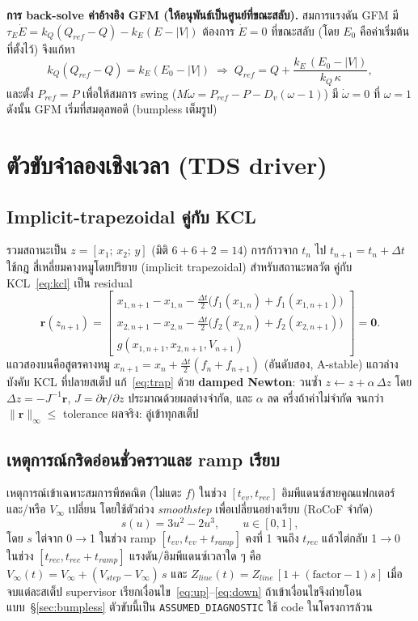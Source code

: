 \documentclass[12pt,a4paper]{article}
\begin{document}
\textbf{การ back-solve ค่าอ้างอิง GFM (ให้อนุพันธ์เป็นศูนย์ที่ขณะสลับ).} สมการแรงดัน GFM มี
$\tau_E\dot E = k_Q(Q_{ref}-Q) - k_E(E-\lvert V\rvert)$ ต้องการ $\dot E=0$ ที่ขณะสลับ (โดย $E_0$ คือค่าเริ่มต้น
ที่ตั้งไว้) จึงแก้หา
\begin{equation}
k_Q(Q_{ref}-Q) = k_E(E_0-\lvert V\rvert)
\;\Rightarrow\;
Q_{ref} = Q + \frac{k_E\,(E_0-\lvert V\rvert)}{k_Q\,\kappa},
\label{eq:qref}
\end{equation}
และตั้ง $P_{ref}=P$ เพื่อให้สมการ swing ($M\dot\omega = P_{ref}-P-D_v(\omega-1)$) มี $\dot\omega=0$ ที่
$\omega=1$ ดังนั้น GFM เริ่มที่สมดุลพอดี (bumpless เต็มรูป)

\section{ตัวขับจำลองเชิงเวลา (TDS driver)}
\label{sec:driver}
\subsection{Implicit-trapezoidal คู่กับ KCL}
รวมสถานะเป็น $z=[x_1;\,x_2;\,y]$ (มิติ $6+6+2=14$) การก้าวจาก $t_n$ ไป $t_{n+1}=t_n+\Delta t$ ใช้กฎ
สี่เหลี่ยมคางหมูโดยปริยาย (implicit trapezoidal) สำหรับสถานะพลวัต คู่กับ KCL~\eqref{eq:kcl} เป็น residual
\begin{equation}
\mathbf{r}(z_{n+1}) =
\begin{bmatrix}
x_{1,n+1} - x_{1,n} - \tfrac{\Delta t}{2}\big(f_1(x_{1,n})+f_1(x_{1,n+1})\big)\\[2pt]
x_{2,n+1} - x_{2,n} - \tfrac{\Delta t}{2}\big(f_2(x_{2,n})+f_2(x_{2,n+1})\big)\\[2pt]
g(x_{1,n+1},x_{2,n+1},V_{n+1})
\end{bmatrix} = \mathbf{0}.
\label{eq:trap}
\end{equation}
แถวสองบนคือสูตรคางหมู $x_{n+1}=x_n+\tfrac{\Delta t}{2}(f_n+f_{n+1})$ (อันดับสอง, A-stable) แถวล่างบังคับ
KCL ที่ปลายสเต็ป แก้~\eqref{eq:trap} ด้วย \textbf{damped Newton}: วนซ้ำ $z\leftarrow z+\alpha\,\Delta z$
โดย $\Delta z=-J^{-1}\mathbf{r}$, $J=\partial \mathbf{r}/\partial z$ ประมาณด้วยผลต่างจำกัด, และ $\alpha$ ลด
ครึ่งถ้าค่าไม่จำกัด จนกว่า $\lVert\mathbf{r}\rVert_\infty\le$ tolerance ผลจริง: ลู่เข้าทุกสเต็ป

\subsection{เหตุการณ์กริดอ่อนชั่วคราวและ ramp เรียบ}
เหตุการณ์เข้าเฉพาะสมการพีชคณิต (ไม่แตะ $f$) ในช่วง $[t_{ev},t_{rec}]$ อิมพีแดนซ์สายคูณแฟกเตอร์และ/หรือ
$V_\infty$ เปลี่ยน โดยใช้ตัวถ่วง \emph{smoothstep} เพื่อเปลี่ยนอย่างเรียบ (RoCoF จำกัด)
\begin{equation}
s(u) = 3u^2 - 2u^3,\qquad u\in[0,1],
\label{eq:smoothstep}
\end{equation}
โดย $s$ ไต่จาก 0$\to$1 ในช่วง ramp $[t_{ev},t_{ev}+t_{ramp}]$ คงที่ 1 จนถึง $t_{rec}$ แล้วไต่กลับ 1$\to$0
ในช่วง $[t_{rec},t_{rec}+t_{ramp}]$ แรงดัน/อิมพีแดนซ์เวลาใด ๆ คือ
$V_\infty(t)=V_\infty + (V_{step}-V_\infty)\,s$ และ $Z_{line}(t)=Z_{line}\,[1+(\text{factor}-1)s]$
เมื่อจบแต่ละสเต็ป supervisor เรียกเงื่อนไข~\eqref{eq:up}--\eqref{eq:down} ถ้าเข้าเงื่อนไขจึงถ่ายโอน
แบบ~\S\ref{sec:bumpless} ตัวขับนี้เป็น \texttt{ASSUMED\_DIAGNOSTIC} ใช้ code ในโครงการล้วน
\end{document}
